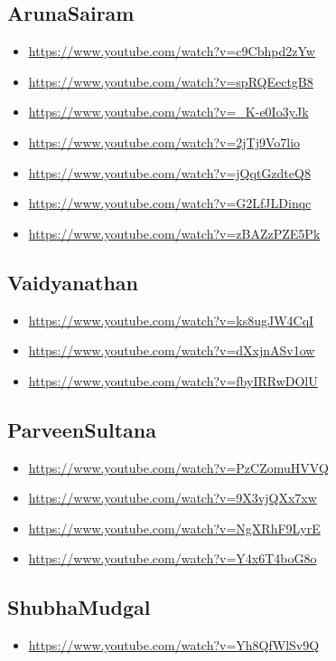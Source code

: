 \subsection{ArunaSairam}
\label{sec:org6e92673}
\begin{itemize}
\item \url{https://www.youtube.com/watch?v=c9Cbhpd2zYw}
\item \url{https://www.youtube.com/watch?v=spRQEectgB8}
\item \url{https://www.youtube.com/watch?v=\_K-e0Io3yJk}
\item \url{https://www.youtube.com/watch?v=2jTj9Vo7lio}
\item \url{https://www.youtube.com/watch?v=jQqtGzdteQ8}
\item \url{https://www.youtube.com/watch?v=G2LfJLDinqc}
\item \url{https://www.youtube.com/watch?v=zBAZzPZE5Pk}
\end{itemize}

\subsection{Vaidyanathan}
\label{sec:org94ad462}
\begin{itemize}
\item \url{https://www.youtube.com/watch?v=ks8ugJW4CqI}
\item \url{https://www.youtube.com/watch?v=dXxjnASv1ow}
\item \url{https://www.youtube.com/watch?v=fbyIRRwDOlU}
\end{itemize}

\subsection{ParveenSultana}
\label{sec:org8edc196}
\begin{itemize}
\item \url{https://www.youtube.com/watch?v=PzCZomuHVVQ}
\item \url{https://www.youtube.com/watch?v=9X3vjQXx7xw}
\item \url{https://www.youtube.com/watch?v=NgXRhF9LyrE}
\item \url{https://www.youtube.com/watch?v=Y4x6T4boG8o}
\end{itemize}

\subsection{ShubhaMudgal}
\label{sec:org3ca3d5e}
\begin{itemize}
\item \url{https://www.youtube.com/watch?v=Yh8QfWlSv9Q}
\end{itemize}

